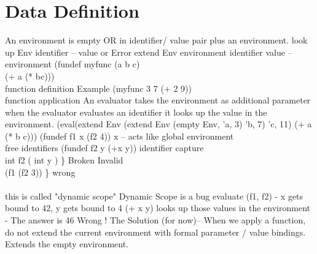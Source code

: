 \documentclass{article}
\begin{document}
\section{Data Definition}
An environment is empty OR in identifier/ value pair plus an environment.
\newline
\newline
look up Env identifier -- value or Error
\newline
\newline
extend Env environment identifier value -- environment
\newline
\newline
(fundef myfunc (a b c)\\
(+ a (* bc))) \\
function definition
\newline
\newline
Example 
\newline
(myfunc 3 7 (+ 2 9))\\
function application
\newline
\newline
An evaluator takes the environment as additional parameter when the evaluator evaluates an identifier it looks up the value in the environment.
\newline
\newline
(eval(extend Env (extend Env (empty Env, 'a, 3) 'b, 7) 'c, 11) (+ a (* b c)))
\newline
\newline
(fundef f1 x (f2 4))   x -- acts like global environment \\     free identifiers
\newline
\newline
(fundef f2 y (+x y))    identifier capture   \\
 int f2 ( int y ) \} Broken Invalid \\ 
 (f1 (f2 3)) \} wrong
 \\
\\
this is called "dynamic scope" Dynamic Scope is a bug
\newline
\newline
evaluate (f1, f2) - x gets bound to 42, y gets bound to 4
\newline
\newline
(+ x y) looks up those values in the environment - The answer is 46 Wrong !
\newline
\newline
The Solution (for now)-- When we apply a function, do not extend the current environment with formal parameter / value bindings. Extends the empty environment.
\end{document}
